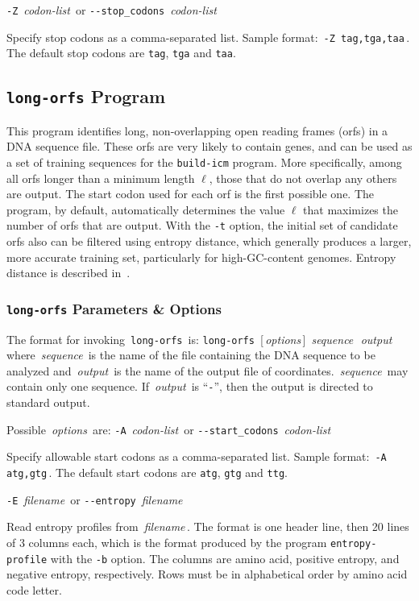\documentclass[fleqn,titlepage,11pt]{article}
\def\Desc#1{\,\mbox{\emph{#1}}\,}
\def\Pg#1{\texttt{#1}}
\begin{document}
\exdent
  \verb`-Z` \Desc{codon-list} \enskip or \enskip \verb`--stop_codons` \Desc{codon-list}

  Specify stop codons as a comma-separated list.
  Sample format:  \,\verb`-Z tag,tga,taa`\,.
  The default stop codons are \Pg{tag}, \Pg{tga} and \Pg{taa}.
\el

\subsection{\Pg{long-orfs} Program}

This program identifies long, non-overlapping open reading frames (orfs)
in a DNA sequence file.  These orfs are very likely to contain genes,
and can be used as a set of training sequences for the \Pg{build-icm}
program.  More specifically, among all orfs longer than a minimum length
$\ell$, those that do not overlap any others are output.  The start
codon used for each orf is the first possible one.  The program, by
default, automatically determines the value $\ell$ that maximizes the
number of orfs that are output.  With the \Pg{-t} option, the initial
set of candidate orfs also can be filtered using entropy distance, which
generally produces a larger, more accurate training set, particularly
for high-GC-content genomes.  Entropy distance is described in~\cite{med1}.

\subsubsection{\Pg{long-orfs} Parameters \& Options}
The format for invoking \,\Pg{long-orfs}\, is:
\bq
  \Pg{long-orfs}\, [\Desc{options}] \Desc{sequence} \Desc{output}
\eq
where \Desc{sequence} is the name of the file containing the DNA sequence
to be analyzed and \Desc{output} is the name of the output file of
coordinates.  \Desc{sequence} may contain only one sequence.
If \Desc{output} is ``\Pg{-}'', then the output is directed to
standard output.

Possible \Desc{options} are:
\bl{}\RaggedRight
\exdent
  \verb`-A` \Desc{codon-list} \enskip or \enskip \verb`--start_codons` \Desc{codon-list}

  Specify allowable start codons as a comma-separated list.
  Sample format:  \,\verb`-A atg,gtg`\,.
  The default start codons are \Pg{atg}, \Pg{gtg} and \Pg{ttg}.

\exdent
  \verb`-E` \Desc{filename} \enskip or \enskip \verb`--entropy` \Desc{filename}

  Read entropy profiles from \Desc{filename}.  The format is one header
  line, then 20 lines of 3 columns each, which is the format produced
  by the program \Pg{entropy-profile} with the \Pg{-b} option.
  The columns are amino acid,
  positive entropy, and negative entropy, respectively.  Rows must be in
  alphabetical order by amino acid code letter.
\end{document}

